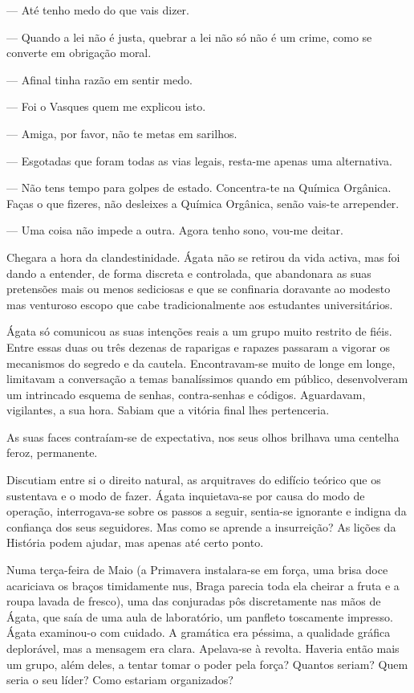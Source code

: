 --- Até tenho medo do que vais dizer.

--- Quando a lei não é justa, quebrar a lei não só não é um crime, como se
  converte em obrigação moral.

--- Afinal tinha razão em sentir medo.

--- Foi o Vasques quem me explicou isto.

--- Amiga, por favor, não te metas em sarilhos.

--- Esgotadas que foram todas as vias legais, resta-me apenas uma
  alternativa.

--- Não tens tempo para golpes de estado. Concentra-te na Química
  Orgânica. Faças o que fizeres, não desleixes a Química Orgânica, senão
  vais-te arrepender.

--- Uma coisa não impede a outra. Agora tenho sono, vou-me deitar.

Chegara a hora da clandestinidade. Ágata não se retirou da vida activa,
mas foi dando a entender, de forma discreta e controlada, que abandonara
as suas pretensões mais ou menos sediciosas e que se confinaria
doravante ao modesto mas venturoso escopo que cabe tradicionalmente
aos estudantes universitários.

Ágata só comunicou as suas intenções reais a um grupo muito restrito de
fiéis. Entre essas duas ou três dezenas de raparigas e rapazes
passaram a vigorar os mecanismos do segredo e da cautela. Encontravam-se
muito de longe em longe, limitavam a conversação a temas banalíssimos
quando em público, desenvolveram um intrincado esquema de senhas, contra-senhas e códigos. Aguardavam, vigilantes, a sua hora. Sabiam que a
vitória final lhes pertenceria.

As suas faces contraíam-se de expectativa, nos seus olhos brilhava uma
centelha feroz, permanente.

Discutiam entre si o direito natural, as arquitraves do edifício
teórico que os sustentava e o modo de fazer. Ágata inquietava-se por
causa do modo de operação, interrogava-se sobre os passos a seguir,
sentia-se ignorante e indigna da confiança dos seus seguidores. Mas como
se aprende a insurreição? As lições da História podem ajudar, mas apenas
até certo ponto.

Numa terça-feira de Maio (a Primavera instalara-se em
força, uma brisa doce acariciava os braços timidamente nus, Braga
parecia toda ela cheirar a fruta e a roupa lavada de fresco), uma das
conjuradas pôs discretamente nas mãos de Ágata, que saía de uma aula de
laboratório, um panfleto toscamente impresso. Ágata examinou-o com
cuidado. A gramática era péssima, a qualidade gráfica deplorável, mas a
mensagem era clara. Apelava-se à revolta. Haveria então mais um grupo,
além deles, a tentar tomar o poder pela força? Quantos seriam?
Quem seria o seu líder? Como estariam organizados?

